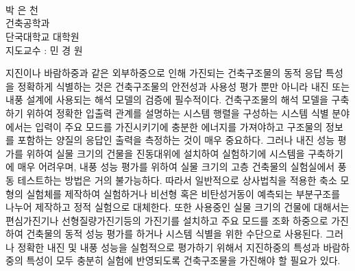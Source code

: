 \begin{center}
 \\
\vspace*{0.3cm}
 \\
\vspace*{0.3cm}
 \\

\end{center}
\begin{flushright}
박 은 천\\
건축공학과\\
단국대학교 대학원\\
\vspace{0.3cm}
지도교수 : 민 경 원
\end{flushright}

\setlength{\baselineskip}{1.5\baselineskip}
지진이나 바람하중과 같은 외부하중으로 인해 가진되는 건축구조물의 동적 응답 특성을 정확하게 식별하는 것은 건축구조물의 안전성과 사용성 평가 뿐만 아니라 내진 또는 내풍 설계에 사용되는 해석 모델의 검증에 필수적이다. 건축구조물의 해석 모델을 구축하기 위하여 정확한 입출력 관계를 설명하는 시스템 행렬을 구성하는 시스템 식별 분야에서는 입력이 주요 모드를 가진시키기에 충분한 에너지를 가져야하고 구조물의 정보를 포함하는 양질의 응답인 출력을 측정하는 것이 매우 중요하다. 그러나 내진 성능 평가를 위하여 실물 크기의 건물을 진동대위에 설치하여 실험하기에 시스템을 구축하기에 매우 어려우며, 내풍 성능 평가를 위하여 실물 크기의 고층 건축물의 실험실에서 풍동 테스트하는 방법은 거의 불가능하다. 따라서 일반적으로 상사법칙을 적용한 축소 모형의 실험체를 제작하여 실험하거나 비선형 혹은 비탄성거동이 예측되는 부분구조를 나누어 제작하고 정적 실험으로 대체한다. 또한 사용중인 실물 크기의 건물에 대해서는 편심가진기나 선형질량가진기등의 가진기를 설치하고 주요 모드를 조화 하중으로 가진하여 건축물의 동적 성능 평가를 하거나 시스템 식별을 위한 수단으로 사용된다. 그러나 정확한 내진 및 내풍 성능을 실험적으로 평가하기 위해서 지진하중의 특성과 바람하중의 특성이 모두 충분히 실험에 반영되도록 건축구조물을 가진해야 할 필요가 있다. 

